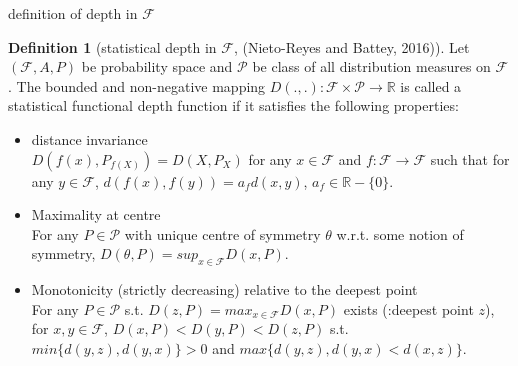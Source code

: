 \documentclass[aspectratio=169,ignorenonframetext,9pt]{beamer}
\theoremstyle{plain}
\theoremstyle{definition}
\newtheorem{defn}{Definition}[section]
\begin{document}
\begin{frame}{definition of depth in $\mathcal{F}$}
    \begin{defn}[statistical depth in $\mathcal{F}$, (Nieto-Reyes and Battey, 2016)]
        Let $(\mathcal{F},A,P)$ be probability space and $\mathcal{P}$ be class of all distribution measures on $\mathcal{F}$.
        The bounded and non-negative mapping $D(.,.): \mathcal{F}\times \mathcal{P} \rightarrow \mathbb{R}$ is called
        a statistical functional depth function if it satisfies the following properties:
        \begin{itemize}
            \item distance invariance \\
                $D(f(x),P_{f(X)})=D(X,P_X)$ for any $x\in\mathcal{F}$ and $f:\mathcal{F}\rightarrow\mathcal{F}$
                such that for any $y\in\mathcal{F}$, $d(f(x),f(y))=a_fd(x,y)$, $a_f\in\mathbb{R}-\{0\}$.
            \item Maximality at centre \\
                For any $P\in\mathcal{P}$ with unique centre of symmetry 
                $\theta$ w.r.t. some notion of symmetry, 
                $D(\theta,P)=sup_{x\in\mathcal{F}}D(x,P)$.
            \item Monotonicity (strictly decreasing) relative to the deepest point \\
                For any $P \in \mathcal{P}$ s.t. $D(z,P)=max_{x\in\mathcal{F}}D(x,P)$ exists (:deepest point $z$), 
                for $x,y\in\mathcal{F}$, $D(x,P)<D(y,P)<D(z,P)$ s.t. $min\{d(y,z),d(y,x)\}>0$ and $max\{d(y,z), d(y,x)<d(x,z)\}$.
            
        \end{itemize}
        \end{defn}
\end{frame}
\end{document}
